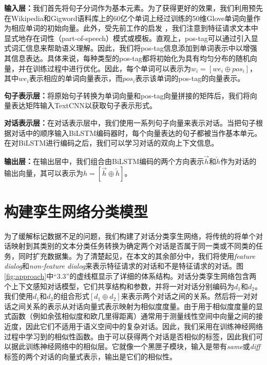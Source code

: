 \textbf{输入层：}我们首先将句子分词作为基本元素。为了获得更好的效果，我们利用预先在Wikipedia和Gigword语料库上的60亿个单词上经过训练的50维Glove单词向量\cite{pennington2014glove}作为相应单词的初始向量。此外，受先前工作的启发\cite{Sorbo2016Development} \cite{shi2017understanding}，我们注意到特征请求文本中显式地存在词性（part-of-speech）模式或模板。直观上，pos-tag可以通过引入显式词汇信息来帮助语义理解。因此，我们将pos-tag信息添加到单词表示中以增强其信息表达。具体来说，每种类型的pos-tag都将初始化为具有均匀分布的随机向量，并在训练过程中进行优化。因此，每个单词可以表示为$w_i=[we_i\oplus pos_i]$，其中$we_i$表示相应的单词向量表示，而$pos_i$表示该单词的pos-tag的向量表示。

\textbf{句子表示层：}将原始句子转换为单词向量和pos-tag向量拼接的矩阵后，我们将向量表达矩阵输入TextCNN以获取句子表示形式。

\textbf{对话表示层：}在对话表示层中，我们使用一系列句子向量来表示对话。当把句子根据对话中的顺序输入BiLSTM编码器时，每个向量表达的句子都被当作基本单元。在对BiLSTM进行编码之后，我们可以学习对话的双向上下文信息。

\textbf{输出层：}在输出层中，我们组合由BiLSTM编码的两个方向表示$\overrightarrow{h}$和$\overleftarrow{h}$作为对话的输出向量，其可以表示为$h=[\overrightarrow{h}\oplus \overleftarrow{h}]$。

\section{构建孪生网络分类模型}
为了缓解标记数据不足的问题，我们构建了对话分类孪生网络，将传统的将单个对话映射到其类别的文本分类任务转换为确定两个对话是否属于同一类或不同类的任务，同时扩充数据集。为了清楚起见，在本文的其余部分中，我们将使用\textit{feature dialog}和\textit{non-feature dialog}来表示特征请求的对话和不是特征请求的对话。图\ref{fig:approach}中“3.3”的虚线框显示了详细的体系结构。对话分类孪生网络包含两个上下文感知对话模型，它们共享结构和参数，并将一对对话分别编码为$d_1$和$d_2$。我们使用$d_1$和$d_2$的组合形式$[{d_1}\oplus {d_2}]$来表示两个对话之间的关系。然后将一对对话之间关系的表示从对话向量式表示映射为相似度度量。由于用于相似度度量的显式函数（例如余弦相似度和欧几里得距离\cite{huang2008similarity}）通常用于测量线性空间中向量之间的接近度，因此它们不适用于语义空间中的复杂对话。因此，我们采用在训练神经网络过程中学习到的相似性函数。由于可以获得两个对话是否相似的标签，因此我们可以据此训练神经网络中的相似层。它就像一个黑匣子模块，输入是带有\textit{same}或\textit{diff}标签的两个对话的向量式表示，输出是它们的相似性。


